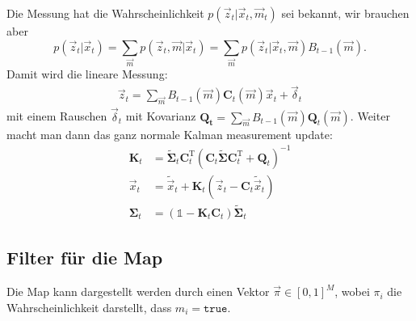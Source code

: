 \documentclass{scrartcl}
\newcommand{\TT}{\mathrm{T}}
\newcommand{\true}{\texttt{true}}
\newcommand{\mat}[1]{\mathbf{#1}}
\renewcommand{\|}{\vert}
\newcommand{\eye}[1][]{\mathbb{1}_{#1}}
\begin{document}
Die Messung hat die Wahrscheinlichkeit $p(\vec{z}_t \| \vec{x}_t, \vec{m}_t)$ sei bekannt, wir brauchen aber 
\[
    p(\vec{z}_t \| \vec{x}_t) = \sum_{\vec{m}} p(\vec{z}_t, \vec{m} \| \vec{x}_t)
	= \sum_{\vec{m}} p(\vec{z}_t \| \vec{x}_t, \vec{m}) B_{t-1}(\vec{m}).
\]
Damit wird die lineare Messung:
\begin{align}
	\vec{z}_t = \sum_{\vec{m}} B_{t-1}(\vec{m}) \mat{C}_t(\vec{m}) \vec{x}_t + \vec{\delta}_t
\end{align}
mit einem Rauschen $\vec{\delta}_t$ mit Kovarianz $\mat{Q_t} = \sum_{\vec m}
B_{t-1}(\vec{m}) \mat{Q}_t(\vec{m})$.
Weiter macht man dann das ganz normale Kalman measurement update:
\begin{align}
    \mat{K}_t &= \mat{\tilde\Sigma}_t \mat{C}_t^\TT (\mat{C}_t \mat{\tilde\Sigma} \mat{C}_t^\TT + \mat{Q}_t)^{-1}
    \\
    \vec{x}_t &= \tilde{\vec{x}}_t + \mat{K}_t (\vec{z}_t - \mat{C}_t \tilde{\vec{x}}_t )
    \\
    \mat{\Sigma}_t &= (\eye - \mat{K}_t \mat{C}_t) \mat{\tilde\Sigma}_t
\end{align}

\subsection{Filter für die Map}
Die Map kann dargestellt werden durch einen Vektor $\vec{\pi} \in [0, 1]^M$,
wobei $\pi_i$ die Wahrscheinlichkeit darstellt, dass $m_i = \true$.
\end{document}
